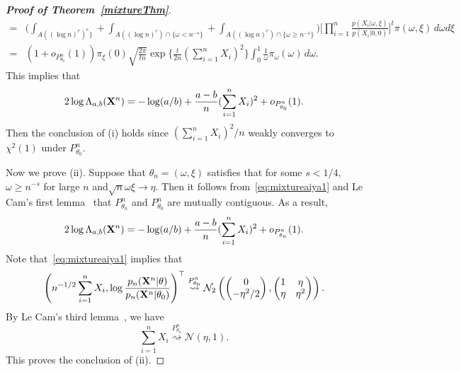 \documentclass[11pt]{article}
\theoremstyle{plain}
\theoremstyle{definition}
\theoremstyle{remark}
\begin{document}
\begin{appendices}
\begin{proof}[\textbf{Proof of Theorem~\ref{mixtureThm}}]
\begin{align*}
=& \bigg( \int_{A( (\log n)^r )^c\}}+\int_{A( (\log n)^r )\cap \{\omega< n^{-s}\}}+\int_{A( (\log n)^r )\cap \{\omega\geq n^{-s}\}}\bigg) \Big[\prod_{i=1}^n \frac{p(X_i|\omega,\xi)}{p(X_i|0,0)}\Big]^t \pi(\omega,\xi)\, d\omega d\xi
    \\
    =&
    (1+o_{P^n_{\theta_0}}(1))\pi_{\xi}(0)\sqrt{\frac{2\pi}{tn}}\exp \Big\{ \frac{t}{2n}(\sum_{i=1}^n X_i)^2\Big\} 
\int_{0}^1 
\frac{1}{\omega}
\pi_{\omega}(\omega)\, d\omega.
\end{align*}
This implies that
\begin{equation*}
    2\log \Lambda_{a,b} (\mathbf{X}^n)=-\log(a/b)+\frac{a-b}{n}(\sum_{i=1}^n X_i)^2+o_{P^n_{\theta_0}}(1).
\end{equation*}
Then the conclusion of (i) holds since $(\sum_{i=1}^n X_i)^2/n$ weakly converges to $ \chi^2(1)$ under $P^n_{\theta_0}$.

Now we prove (ii). Suppose that $\theta_n=(\omega,\xi)$ satisfies that for some $s<1/4$, $\omega\geq n^{-s}$ for large $n$ and$\sqrt{n}\omega \xi \to \eta$.
Then it follows from~\eqref{eq:mixtureaiya1} and Le Cam's first lemma~\citep[Theorem 6.4]{van2000asymptotic} that
$P^n_{\theta_n}$ and $P^n_{\theta_0}$ are mutually contiguous.
As a result,
\begin{equation*}
    2\log \Lambda_{a,b} (\mathbf{X}^n) = -\log(a/b)+\frac{a-b}{n}(\sum_{i=1}^n X_i)^2+o_{P^n_{\theta_n}}(1).
\end{equation*}
Note that~\eqref{eq:mixtureaiya1} implies that
\begin{equation*}
        \left(n^{-1/2}\sum_{i=1}^n X_i,\log \frac{p_n(\mathbf{X}^{n}|\theta)}{p_n(\mathbf{X}^{n}|\theta_0)}\right)^\top 
        \overset{P^n_{\theta_0}}{\rightsquigarrow}
        \mathcal{N}_2\left(
    \begin{pmatrix}
        0\\
        -{\eta^2}/{2}
    \end{pmatrix}
    ,
    \begin{pmatrix}
        1 & \eta\\
        \eta & \eta^2
    \end{pmatrix}
\right).
\end{equation*}
By Le Cam's third lemma~\citep[Example 6.7]{van2000asymptotic}, we have
\begin{equation*}
    \sum_{i=1}^n X_i
    \overset{P^n_{\theta_n}}{\rightsquigarrow} \mathcal{N}(\eta,1).
\end{equation*}
This proves the conclusion of (ii).

\end{proof}

\end{appendices}
\end{document}
